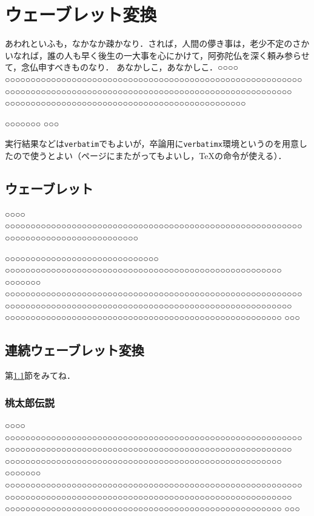

\chapter{ウェーブレット変換}
あわれといふも，なかなか疎かなり．されば，人間の儚き事は，老少不定のさかいなれば，誰の人も早く後生の一大事を心にかけて，阿弥陀仏を深く頼み参らせて，念仏申すべきものなり． あなかしこ，あなかしこ．○○○○ ○○○○○○○○○○○○○○○○○○○○○○○○○○○○○○○○○○○○○○○○○○○○○○○○○○○○○○○○○○ ○○○○○○○○○○○○○○○○○○○○○○○○○○○○○○○○○○○○○○○○○○○○○○○○○○○○○○○○ ○○○○○○○○○○○○○○○○○○○○○○○○○○○○○○○○○○○○○○○○○○○○○○○

○○○○○○○ ○○○

実行結果などは\texttt{verbatim}でもよいが，卒論用に\texttt{verbatimx}環境というのを用意したので使うとよい（ページにまたがってもよいし，\TeX の命令が使える）．






\section{ウェーブレット}\label{AAAB}
○○○○ ○○○○○○○○○○○○○○○○○○○○○○○○○○○○○○○○○○○○○○○○○○○○○○○○○○○○○○○○○○ ○○○○○○○○○○○○○○○○○○○○○○○○○○

○○○○○○○○○○○○○○○○○○○○○○○○○○○○○○ ○○○○○○○○○○○○○○○○○○○○○○○○○○○○○○○○○○○○○○○○○○○○○○○○○○○○○○ ○○○○○○○ ○○○○○○○○○○○○○○○○○○○○○○○○○○○○○○○○○○○○○○○○○○○○○○○○○○○○○○○○○○ ○○○○○○○○○○○○○○○○○○○○○○○○○○○○○○○○○○○○○○○○○○○○○○○○○○○○○○○○ ○○○○○○○○○○○○○○○○○○○○○○○○○○○○○○○○○○○○○○○○○○○○○○○○○○○○○○ ○○○
\section{連続ウェーブレット変換}

第\ref{AAAB}節をみてね．

\subsection{桃太郎伝説}
○○○○ ○○○○○○○○○○○○○○○○○○○○○○○○○○○○○○○○○○○○○○○○○○○○○○○○○○○○○○○○○○ ○○○○○○○○○○○○○○○○○○○○○○○○○○○○○○○○○○○○○○○○○○○○○○○○○○○○○○○○ ○○○○○○○○○○○○○○○○○○○○○○○○○○○○○○○○○○○○○○○○○○○○○○○○○○○○○○ ○○○○○○○ ○○○○○○○○○○○○○○○○○○○○○○○○○○○○○○○○○○○○○○○○○○○○○○○○○○○○○○○○○○ ○○○○○○○○○○○○○○○○○○○○○○○○○○○○○○○○○○○○○○○○○○○○○○○○○○○○○○○○ ○○○○○○○○○○○○○○○○○○○○○○○○○○○○○○○○○○○○○○○○○○○○○○○○○○○○○○ ○○○

